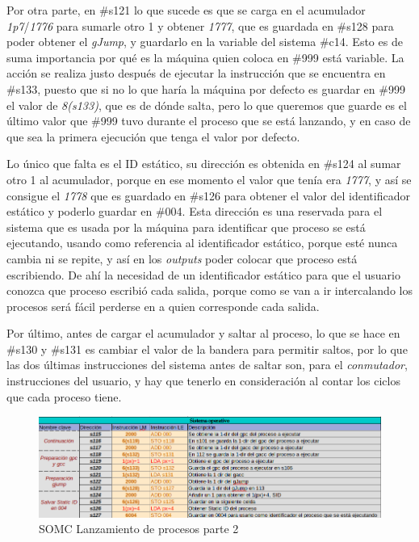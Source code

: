 \documentclass[letterpaper,12pt,oneside]{book}
\begin{document}
        Por otra parte, en \#s121 lo que sucede es que se carga
		en el acumulador \textit{1p7}/\textit{1776} para sumarle otro 1 y obtener \textit{1777}, que es guardada en \#s128 para poder obtener el 
		\textit{gJump}, y guardarlo en la variable del sistema \#c14. Esto es de suma importancia por qué es la máquina quien coloca en \#999 está 	
		variable. La acción se realiza justo después
		de ejecutar la instrucción que se encuentra en \#s133, puesto que si no lo que haría la máquina por defecto es guardar en \#999 el valor de \textit{8(s133)}, que es de dónde salta, pero lo que
		queremos que guarde es el último valor que \#999  tuvo durante el proceso que se está lanzando, y en caso de que sea la primera ejecución que tenga el valor
		por defecto.
		
		Lo único que falta es el ID estático, su dirección es obtenida en \#s124 al sumar otro 1 al acumulador, porque en ese momento el valor que tenía
		era \textit{1777}, y así se consigue el \textit{1778} que es guardado en \#s126 para obtener el valor del identificador estático y poderlo guardar
		en \#004. Esta dirección es una reservada para el sistema que es usada por la máquina para identificar que proceso se está ejecutando, usando como referencia al
		identificador estático, porque esté nunca cambia ni se repite, y así en los \textit{outputs} poder colocar que proceso está escribiendo. De ahí la necesidad
		de un identificador estático para que el usuario conozca que proceso escribió cada salida, porque como se van a ir intercalando los procesos será fácil
		perderse en a quien corresponde cada salida.
  
        Por último, antes de cargar el acumulador y saltar al proceso, lo que se hace en \#s130 y \#s131 es cambiar el valor
		de la bandera para permitir saltos, por lo que las dos últimas instrucciones del sistema antes de saltar son, para el \textit{conmutador}, instrucciones
		del usuario, y hay que tenerlo en consideración al contar los ciclos que cada proceso tiene.
		
		
		\begin{figure}[h]		
			\centering
			\includegraphics[scale=0.53]{media/CARDIACC/SO_EjecutarProceso2.png}
			\caption{ SOMC Lanzamiento de procesos parte 2 }
			\label{fig:somcLanzamientoP2}
		\end{figure}
		
\end{document}
